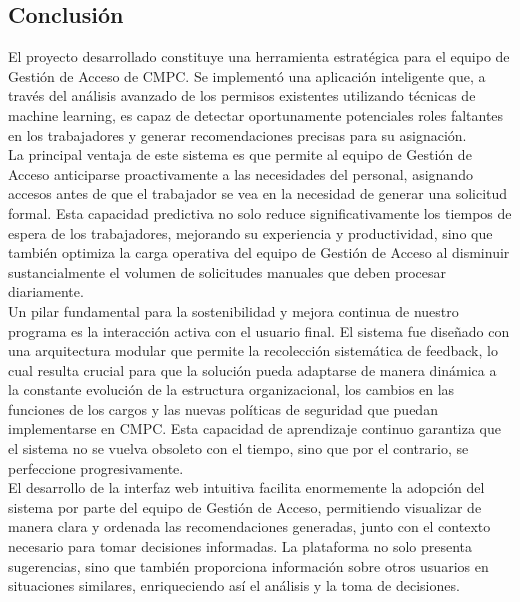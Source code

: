 \documentclass[11pt,letterpaper]{article}
\begin{document}
\begin{itemize}

\section{Conclusión}

El proyecto desarrollado constituye una herramienta estratégica para el equipo de Gestión de Acceso de CMPC. Se implementó una aplicación inteligente que, a través del análisis avanzado de los permisos existentes utilizando técnicas de machine learning, es capaz de detectar oportunamente potenciales roles faltantes en los trabajadores y generar recomendaciones precisas para su asignación.
\\

La principal ventaja de este sistema es que permite al equipo de Gestión de Acceso anticiparse proactivamente a las necesidades del personal, asignando accesos antes de que el trabajador se vea en la necesidad de generar una solicitud formal. Esta capacidad predictiva no solo reduce significativamente los tiempos de espera de los trabajadores, mejorando su experiencia y productividad, sino que también optimiza la carga operativa del equipo de Gestión de Acceso al disminuir sustancialmente el volumen de solicitudes manuales que deben procesar diariamente.
\\

Un pilar fundamental para la sostenibilidad y mejora continua de nuestro programa es la interacción activa con el usuario final. El sistema fue diseñado con una arquitectura modular que permite la recolección sistemática de feedback, lo cual resulta crucial para que la solución pueda adaptarse de manera dinámica a la constante evolución de la estructura organizacional, los cambios en las funciones de los cargos y las nuevas políticas de seguridad que puedan implementarse en CMPC. Esta capacidad de aprendizaje continuo garantiza que el sistema no se vuelva obsoleto con el tiempo, sino que por el contrario, se perfeccione progresivamente.
\\

El desarrollo de la interfaz web intuitiva facilita enormemente la adopción del sistema por parte del equipo de Gestión de Acceso, permitiendo visualizar de manera clara y ordenada las recomendaciones generadas, junto con el contexto necesario para tomar decisiones informadas. La plataforma no solo presenta sugerencias, sino que también proporciona información sobre otros usuarios en situaciones similares, enriqueciendo así el análisis y la toma de decisiones.
\\


\end{itemize}
\end{document}
